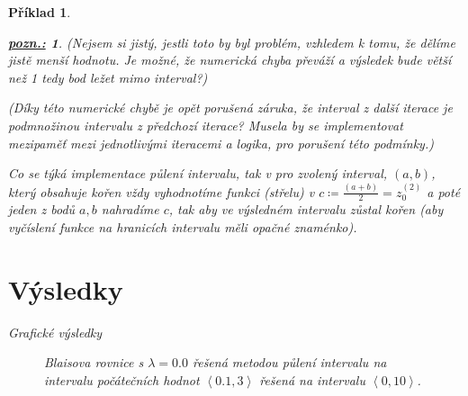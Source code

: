 \documentclass{article}
\newtheorem{example}{Příklad}
\newtheorem*{remark}{\underline{\it pozn.:}}
\begin{document}
\begin{example}
\begin{remark}
		(Nejsem si jistý, jestli toto by byl problém, vzhledem k tomu, že dělíme jistě menší hodnotu. Je možné, že numerická chyba převáží a výsledek bude větší než 1 tedy bod ležet mimo interval?)

		(Díky této numerické chybě je opět porušená záruka, že interval z další iterace je podmnožinou intervalu z předchozí iterace? Musela by se implementovat mezipaměť mezi jednotlivými iteracemi a logika, pro porušení této podmínky.)
	\end{remark}

	Co se týká implementace půlení intervalu, tak v pro zvolený interval, $(a,b)$, který obsahuje kořen vždy vyhodnotíme funkci (střelu) v $ c \coloneqq \frac{(a+b)}{2} = z^{(2)}_{0}$ a poté jeden z bodů $a,b$ nahradíme $c$, tak aby ve výsledném intervalu zůstal kořen (aby vyčíslení funkce na hranicích intervalu měli opačné znaménko).\pagebreak

	\section*{Výsledky}
	Grafické výsledky

    \begin{figure}[h]
	\centering
    \def\svgwidth{\textwidth}
	
    \caption{Blaisova rovnice s $\lambda = 0.0$ řešená metodou půlení intervalu na intervalu počátečních hodnot $\left<0.1,3 \right>$ řešená na intervalu $\left<0,10 \right>$.}
    \end{figure}

\end{example}
\end{document}
